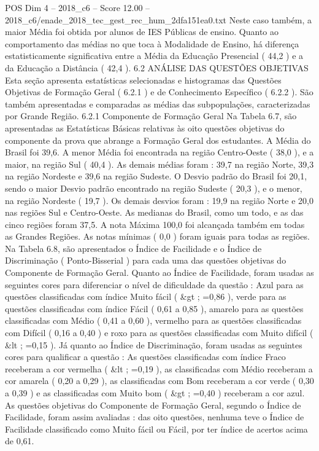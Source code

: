 \begin{textsample}{POS Dim 4 – 2018\_c6 – Score 12.00 – 2018\_c6/enade\_2018\_tec\_gest\_rec\_hum\_2dfa151ea0.txt}
Neste caso também, a maior Média foi obtida por alunos de IES Públicas de ensino.
Quanto ao comportamento das médias no que toca à Modalidade de Ensino, há diferença estatisticamente significativa entre a Média da Educação Presencial ( 44,2 ) e a da Educação a Distância ( 42,4 ). 6.2 ANÁLISE DAS QUESTÕES OBJETIVAS Esta seção apresenta estatísticas selecionadas e histogramas das Questões Objetivas de Formação Geral ( 6.2.1 ) e de Conhecimento Específico ( 6.2.2 ).
São também apresentadas e comparadas as médias das subpopulações, caracterizadas por Grande Região. 6.2.1 Componente de Formação Geral Na Tabela 6.7, são apresentadas as Estatísticas Básicas relativas às oito questões objetivas do componente da prova que abrange a Formação Geral dos estudantes.
A Média do Brasil foi 39,6.
A menor Média foi encontrada na região Centro-Oeste ( 38,0 ), e a maior, na região Sul ( 40,4 ).
As demais médias foram : 39,7 na região Norte, 39,3 na região Nordeste e 39,6 na região Sudeste.
O Desvio padrão do Brasil foi 20,1, sendo o maior Desvio padrão encontrado na região Sudeste ( 20,3 ), e o menor, na região Nordeste ( 19,7 ).
Os demais desvios foram : 19,9 na região Norte e 20,0 nas regiões Sul e Centro-Oeste.
As medianas do Brasil, como um todo, e as das cinco regiões foram 37,5.
A nota Máxima 100,0 foi alcançada também em todas as Grandes Regiões.
As notas mínimas ( 0,0 ) foram iguais para todas as regiões.
Na Tabela 6.8, são apresentados o Índice de Facilidade e o Índice de Discriminação ( Ponto-Bisserial ) para cada uma das questões objetivas do Componente de Formação Geral.
Quanto ao Índice de Facilidade, foram usadas as seguintes cores para diferenciar o nível de dificuldade da questão : Azul para as questões classificadas com índice Muito fácil ( \&gt ; =0,86 ), verde para as questões classificadas com índice Fácil ( 0,61 a 0,85 ), amarelo para as questões classificadas com Médio ( 0,41 a 0,60 ), vermelho para as questões classificadas com Difícil ( 0,16 a 0,40 ) e roxo para as questões classificadas com Muito difícil ( \&lt ; =0,15 ).
Já quanto ao Índice de Discriminação, foram usadas as seguintes cores para qualificar a questão : As questões classificadas com índice Fraco receberam a cor vermelha ( \&lt ; =0,19 ), as classificadas com Médio receberam a cor amarela ( 0,20 a 0,29 ), as classificadas com Bom receberam a cor verde ( 0,30 a 0,39 ) e as classificadas com Muito bom ( \&gt ; =0,40 ) receberam a cor azul.
As questões objetivas do Componente de Formação Geral, segundo o Índice de Facilidade, foram assim avaliadas : das oito questões, nenhuma teve o Índice de Facilidade classificado como Muito fácil ou Fácil, por ter índice de acertos acima de 0,61.

\end{textsample}
